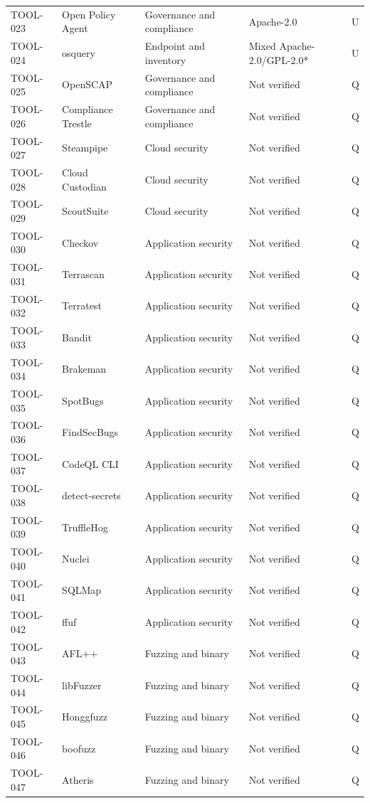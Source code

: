 \documentclass[11pt,oneside]{report}
\begin{document}
\begin{longtable}{P{0.10\textwidth}P{0.32\textwidth}P{0.22\textwidth}P{0.155\textwidth}P{0.055\textwidth}}
TOOL-023 & Open Policy Agent & Governance and compliance & Apache-2.0 & U \\
TOOL-024 & osquery & Endpoint and inventory & Mixed Apache-2.0/GPL-2.0* & U \\
TOOL-025 & OpenSCAP & Governance and compliance & Not verified & Q \\
TOOL-026 & Compliance Trestle & Governance and compliance & Not verified & Q \\
TOOL-027 & Steampipe & Cloud security & Not verified & Q \\
TOOL-028 & Cloud Custodian & Cloud security & Not verified & Q \\
TOOL-029 & ScoutSuite & Cloud security & Not verified & Q \\
TOOL-030 & Checkov & Application security & Not verified & Q \\
TOOL-031 & Terrascan & Application security & Not verified & Q \\
TOOL-032 & Terratest & Application security & Not verified & Q \\
TOOL-033 & Bandit & Application security & Not verified & Q \\
TOOL-034 & Brakeman & Application security & Not verified & Q \\
TOOL-035 & SpotBugs & Application security & Not verified & Q \\
TOOL-036 & FindSecBugs & Application security & Not verified & Q \\
TOOL-037 & CodeQL CLI & Application security & Not verified & Q \\
TOOL-038 & detect-secrets & Application security & Not verified & Q \\
TOOL-039 & TruffleHog & Application security & Not verified & Q \\
TOOL-040 & Nuclei & Application security & Not verified & Q \\
TOOL-041 & SQLMap & Application security & Not verified & Q \\
TOOL-042 & ffuf & Application security & Not verified & Q \\
TOOL-043 & AFL++ & Fuzzing and binary & Not verified & Q \\
TOOL-044 & libFuzzer & Fuzzing and binary & Not verified & Q \\
TOOL-045 & Honggfuzz & Fuzzing and binary & Not verified & Q \\
TOOL-046 & boofuzz & Fuzzing and binary & Not verified & Q \\
TOOL-047 & Atheris & Fuzzing and binary & Not verified & Q \\

\end{longtable}
\end{document}
